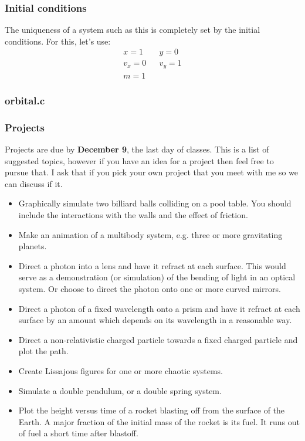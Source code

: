 \documentclass{beamer}
\begin{document}
\begin{frame}
  \frametitle{Initial conditions}
  The uniqueness of a system such as this is completely set by the
  initial conditions. For this, let's use:
  \begin{eqnarray*}
    x = 1 && y = 0\\
    v_x = 0 && v_y = 1\\
    m = 1
  \end{eqnarray*}
\end{frame}

\begin{frame}
  \frametitle{orbital.c}
  
\end{frame}

\begin{frame}[allowframebreaks]
  \frametitle{Projects}
  Projects are due by \textbf{December 9}, the last day of classes. 
  This is a list of suggested topics, 
  however if you have an idea for a project then feel free to pursue that.
  I ask that if you pick your own project that you meet with me so
  we can discuss if it.
  \begin{itemize}
  \item Graphically simulate two billiard balls colliding on a pool table.
    You should include the interactions with the walls and the 
    effect of friction.
  \item Make an animation of a multibody system, e.g. three or more gravitating
    planets.
  \item Direct a photon into a lens and have it refract at each surface. This
    would serve as a demonstration (or simulation) of the bending of light in
    an optical system. Or choose to direct the photon onto one or more curved
    mirrors.
  \item Direct a photon of a fixed wavelength onto a prism and have it refract 
    at each surface by an amount which depends on its wavelength in a 
    reasonable way.
  \item Direct a non-relativistic charged particle towards a fixed charged 
    particle and plot the path.
  \item Create Lissajous figures for one or more chaotic systems.
  \item Simulate a double pendulum, or a double spring system.
  \item Plot the height versus time of a rocket blasting off from the
    surface of the Earth. A major fraction of the initial mass of the
    rocket is its fuel. It runs out of fuel a short time after blastoff.

\end{itemize}
\end{frame}
\end{document}
